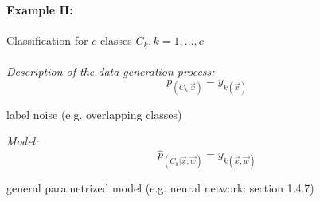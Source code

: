 \paragraph{Example II:} Classification for $c$ classes $C_k, k = 1, \ldots, c$
\\\\
\emph{Description of the data generation process:}
\begin{equation}
	p_{(C_k|\vec{x})} = y_{k(\vec{x})}
\end{equation}
\begin{itemize}
	\itl label noise (e.g. overlapping classes)
\end{itemize}
\emph{Model:}
\begin{equation}
	\widehat{p}_{(C_k|\vec{x};\vec{w})} = y_{k(\vec{x};\vec{w})}
\end{equation}
\begin{itemize}
	\itl general parametrized model (e.g. neural network: section 1.4.7)
\end{itemize}


